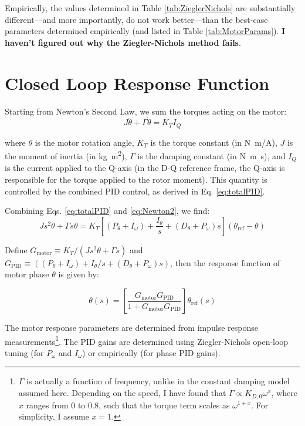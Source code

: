 \documentclass[11pt]{article} %
\begin{document}
\noindent Empirically, the values determined in Table \ref{tab:ZieglerNichols} are substantially different---and more importantly, do not work better---than the best-case parameters determined empirically (and listed in Table \ref{tab:MotorParams}). \textbf{I haven't figured out why the Ziegler-Nichols method fails}.

\section{Closed Loop Response Function}
Starting from Newton's Second Law, we sum the torques acting on the motor:
\begin{equation}
J \ddot{\theta} + \Gamma \dot{\theta} = K_T I_Q
\label{eq:Newton2}
\end{equation}

\noindent where $\theta$ is the motor rotation angle, $K_T$ is the torque constant (in \si{N.m/A}), $J$ is the moment of inertia (in \si{kg.m^2}), $\Gamma$ is the damping constant (in \si{N.m.s}), and $I_Q$ is the current applied to the Q-axis (in the D-Q reference frame, the Q-axis is responsible for the torque applied to the rotor moment). This quantity is controlled by the combined PID control, as derived in Eq. \ref{eq:totalPID}.

Combining Eqs. \ref{eq:totalPID} and \ref{eq:Newton2}, we find:
\begin{equation}
J s^2 \theta + \Gamma s \theta = K_T \left[(P_{\theta} + I_{\omega}) + \frac{I_{\theta}}{s}  + (D_{\theta} + P_{\omega})s\right] (\theta_\mathrm{ref} - \theta) 
\label{eq:Newton2withPID}
\end{equation}

\noindent Define $G_\mathrm{motor} \equiv  K_T/(J s^2 \theta + \Gamma s)$ and $G_\mathrm{PID} \equiv ((P_{\theta} + I_{\omega}) + I_{\theta}/s  + (D_{\theta} + P_{\omega})s)$, then the response function of motor phase $\theta$ is given by:

\begin{equation}
\theta(s) = \left[\frac{G_\mathrm{motor} G_\mathrm{PID}}{1 + G_\mathrm{motor} G_\mathrm{PID}}\right] \theta_\mathrm{ref}(s)
\end{equation}

The motor response parameters are determined from impulse response measurements\footnote{$\Gamma$ is actually a function of frequency, unlike in the constant damping model assumed here. Depending on the speed, I have found that $\Gamma \propto K_{D,0} \omega^x$, where $x$ ranges from 0 to 0.8, such that the torque term scales as $\omega^{1+x}$. For simplicity, I assume $x=1$.}. The PID gains are determined using Ziegler-Nichols open-loop tuning (for $P_\omega$ and $I_\omega$) or empirically (for phase PID gains).
\end{document}
